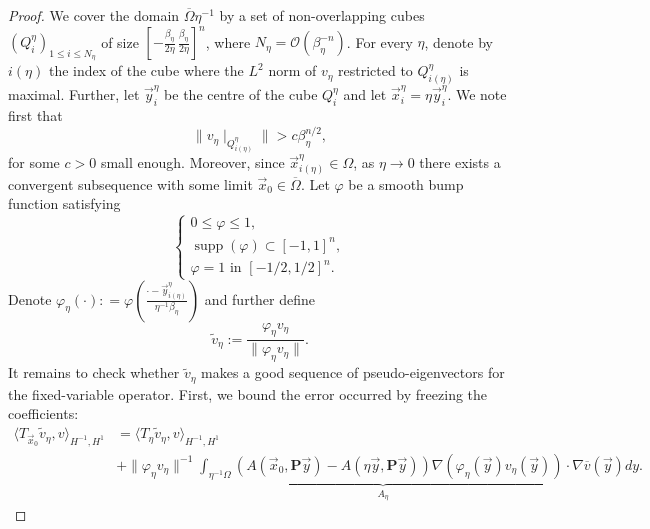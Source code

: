 \documentclass[10pt,a4paper]{amsart}
\renewcommand{\bar}[1]{\overline{#1}}
\renewcommand{\tilde}{\widetilde}
\begin{document}
\begin{proof}
    We cover the domain $\bar{\Omega}\eta^{-1}$ by a set of non-overlapping cubes $(Q^\eta_i)_{1\leq i\leq N_\eta}$ of size $[-\frac{\beta_\eta}{2\eta}\,\frac{\beta_\eta}{2\eta}]^n$, where $N_\eta = \mathcal{O}(\beta_\eta^{-n})$. For every $\eta$, denote by $i(\eta)$ the index of the cube where the $L^2$ norm of $v_\eta$ restricted to $Q^\eta_{i(\eta)}$ is maximal. Further, let $\vec{y}^\eta_i$ be the centre of the cube $Q^\eta_i$ and let $\vec{x}^\eta_i = \eta\vec{y}^\eta_i$. We note first that
    \begin{equation}\label{eq: FrozenCoefficients1}
        \lVert v_\eta\mid_{Q^\eta_{i(\eta)}}\rVert > c\beta_\eta^{n/2},
    \end{equation}
    for some $c>0$ small enough. Moreover, since $\vec{x}^\eta_{i(\eta)}\in \Omega$, as $\eta\to0$ there exists a convergent subsequence with some limit $\vec{x}_0\in \bar{\Omega}$. Let $\varphi$ be a smooth bump function satisfying
    \begin{equation}
        \begin{cases}
            0 \leq \varphi \leq 1,\\
            \operatorname{supp}(\varphi)\subset[-1,1]^n,\\
            \varphi=1 \text{ in } [-1/2,1/2]^n.
        \end{cases}
    \end{equation}
    Denote $\varphi_\eta(\cdot): = \varphi\left(\frac{\cdot-\vec{y}^\eta_{i(\eta)}}{\eta^{-1}\beta_\eta}\right)$ and further define
    \begin{equation}
        \tilde{v}_\eta := \frac{\varphi_\eta v_\eta}{\lVert \varphi_\eta v_\eta\rVert}.
    \end{equation}
    It remains to check whether $\tilde{v}_\eta$ makes a good sequence of pseudo-eigenvectors for the fixed-variable operator. First, we bound the error occurred by freezing the coefficients: 
    \begin{equation}\label{eq: FrozenCoefficients2}
        \begin{aligned}
            \langle T_{\vec{x}_0}\tilde{v}_\eta,v \rangle_{H^{-1},H^{1}}&=\langle T_{\eta}\tilde{v}_\eta,v \rangle_{H^{-1},H^{1}}\\
            &+ \underbrace{\lVert \varphi_\eta v_\eta\rVert^{-1}\int_{\eta^{-1}\Omega}\left(A\left( \vec{x}_0, \textbf{P}\vec{y}\right)-A\left( \eta\vec{y}, \textbf{P}\vec{y}\right)\right)\nabla  (\varphi_\eta(\vec{y})v_\eta(\vec{y})) \cdot \nabla \overline{v}(\vec{y})dy}_{A_\eta}.    

\end{aligned}
\end{equation}
\end{proof}
\end{document}
